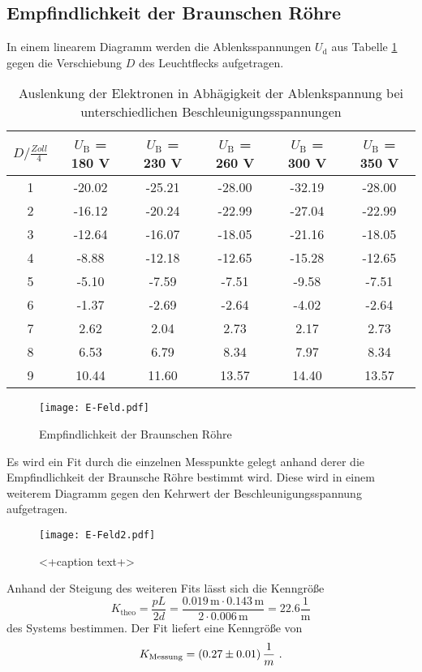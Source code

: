 \subsection{Empfindlichkeit der Braunschen Röhre}
In einem linearem Diagramm werden die Ablenksspannungen $U_\text{d}$ aus Tabelle \ref{tab:DIS} gegen die Verschiebung $D$ des Leuchtflecks aufgetragen.
\begin{table}
  \centering
  \begin{tabular}{c| c c c c c }
    \toprule
    $D / \frac{Zoll}{4}$ & $U_\text{B}$ = 180 V & $U_\text{B}$ = 230 V & $U_\text{B}$ = 260 V & $U_\text{B}$ = 300 V & $U_\text{B}$ = 350 V \\
    \midrule
    1 &	-20.02	&-25.21	&-28.00	&-32.19	&-28.00	\\
    2 &	-16.12	&-20.24	&-22.99	&-27.04	&-22.99	\\
    3 &	-12.64	&-16.07	&-18.05	&-21.16	&-18.05	\\
    4 &	-8.88	&-12.18	&-12.65	&-15.28	&-12.65	\\	
    5 &	-5.10	&-7.59	&-7.51	&-9.58	&-7.51	\\
    6 &	-1.37	&-2.69	&-2.64	&-4.02	&-2.64	\\
    7 &	2.62	&2.04	&2.73	&2.17	&2.73	\\
    8 &	6.53	&6.79	&8.34	&7.97	&8.34	\\
    9 &	10.44	&11.60	&13.57	&14.40	&13.57	\\
    \bottomrule
  \end{tabular}
  \caption{Auslenkung der Elektronen in Abhägigkeit der Ablenkspannung bei unterschiedlichen Beschleunigungsspannungen}
  \label{tab:DIS}
\end{table}
\begin{figure}
  \centering
  \texttt{[image: E-Feld.pdf]}
  \caption{Empfindlichkeit der Braunschen Röhre}
  \label{fig:empf}
\end{figure}
Es wird ein Fit durch die einzelnen Messpunkte gelegt anhand derer die Empfindlichkeit der Braunsche Röhre bestimmt wird. Diese wird in einem weiterem Diagramm gegen den Kehrwert der Beschleunigungsspannung aufgetragen.
\begin{figure}
  \centering
  \texttt{[image: E-Feld2.pdf]}
  \caption{<+caption text+>}
  \label{fig:<+label+>}
\end{figure}
Anhand der Steigung des weiteren Fits lässt sich die Kenngröße 
\begin{equation}
  K_\text{theo} = \frac{p L}{2 d} = \frac{0.019 \, \text{m} \cdot 0.143 \, \text{m}}{2 \cdot 0.006 \, \text{m}} = 22.6 \frac{1}{\text{m}}
  \label{eqn:Ktheo}
\end{equation} 
des Systems bestimmen. Der Fit liefert eine Kenngröße von 
\begin{equation}
  K_\text{Messung} = (\num{0.27 +- 0.01}) \, \frac{1}{m} \ .
  \label{Kmess}
\end{equation}
